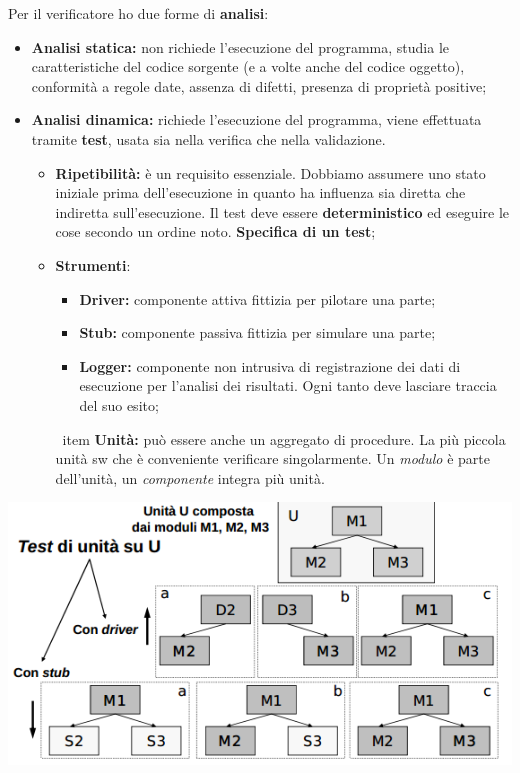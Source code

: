 Per il verificatore ho due forme di \textbf{analisi}:

\begin{itemize}

	\item \textbf{Analisi statica:} non richiede l'esecuzione del programma, studia le caratteristiche del codice sorgente (e a volte anche del codice oggetto), conformità a regole date, assenza di difetti, presenza di proprietà positive;
	\item \textbf{Analisi dinamica:} richiede l'esecuzione del programma, viene effettuata tramite \textbf{test}, usata sia nella verifica che nella validazione.						\begin{itemize}

			\item \textbf{Ripetibilità:} è un requisito essenziale. Dobbiamo assumere uno stato iniziale prima dell'esecuzione in quanto ha influenza sia diretta che indiretta sull'esecuzione. Il test deve essere \textbf{deterministico} ed eseguire le cose secondo un ordine noto. \textbf{Specifica di un test};
			\item \textbf{Strumenti}:
				\begin{itemize}

					\item \textbf{Driver:} componente attiva fittizia per pilotare una parte;
					\item \textbf{Stub:} componente passiva fittizia per simulare una parte;
					\item \textbf{Logger:} componente non intrusiva di registrazione dei dati di esecuzione per l'analisi dei risultati. Ogni tanto deve lasciare traccia del suo esito;	
	
				\end{itemize}
	\		item \textbf{Unità:} può essere anche un aggregato di procedure. La più piccola unità sw che è conveniente verificare singolarmente. Un \textit{modulo} è parte dell'unità, un \textit{componente} integra più unità.

		\end{itemize}

\end{itemize}

\includegraphics[width=0.5\columnwidth]{img3} %

